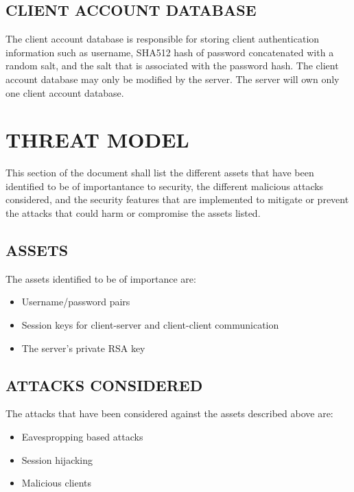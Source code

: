 \documentclass[twoside,letterpaper]{article}
\begin{document}
\bigskip

\subsection{CLIENT ACCOUNT DATABASE}
The client account database is responsible for storing client authentication information such as username, 
SHA512 hash of password concatenated with a random salt, and the salt that is associated with the password
hash. The client account database may only be modified by the server. The server will own only one client
account database.

\bigskip

\section{THREAT MODEL}
This section of the document shall list the different assets that have been identified to be of importantance to
security, the different malicious attacks considered, and the security features
that are implemented to mitigate or prevent the attacks that could harm or compromise the assets listed.

\bigskip

\subsection{ASSETS}
The assets identified to be of importance are:
 
 \begin{itemize}
 \item Username/password pairs
 \item Session keys for client-server and client-client communication
 \item The server's private RSA key
 \end{itemize}
 
 \bigskip

\subsection{ATTACKS CONSIDERED}
The attacks that have been considered against the assets described above are:

\begin{itemize}
\item Eavespropping based attacks
\item Session hijacking
\item Malicious clients
\end{itemize}
\end{document}
